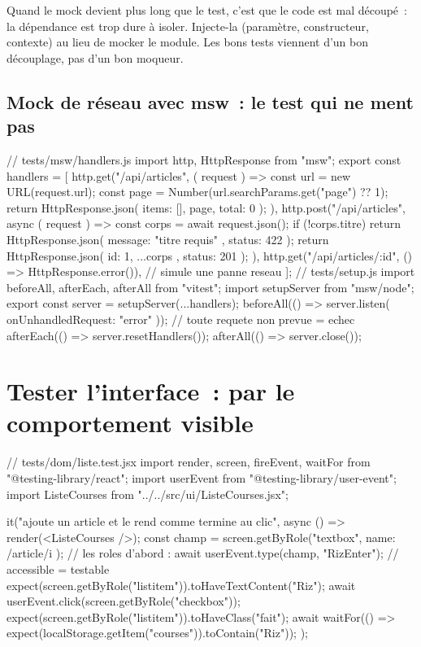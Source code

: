\documentclass[12pt,a4paper,twoside,openright]{book}
\begin{document}
\begin{astuce}
Quand le mock devient plus long que le test, c'est que le code est mal d\'ecoup\'e~: la d\'ependance
est trop dure \`a isoler. Injecte-la (param\`etre, constructeur, contexte) au lieu de mocker le
module. Les bons tests viennent d'un bon d\'ecouplage, pas d'un bon moqueur.
\end{astuce}

\subsection{Mock de r\'eseau avec msw~: le test qui ne ment pas}

\begin{codejs}
// tests/msw/handlers.js
import { http, HttpResponse } from "msw";
export const handlers = [
  http.get("/api/articles", ({ request }) => {
    const url = new URL(request.url);
    const page = Number(url.searchParams.get("page") ?? 1);
    return HttpResponse.json({ items: [], page, total: 0 });
  }),
  http.post("/api/articles", async ({ request }) => {
    const corps = await request.json();
    if (!corps.titre) return HttpResponse.json({ message: "titre requis" }, { status: 422 });
    return HttpResponse.json({ id: 1, ...corps }, { status: 201 });
  }),
  http.get("/api/articles/:id", () => HttpResponse.error()),        // simule une panne reseau
];
// tests/setup.js
import { beforeAll, afterEach, afterAll } from "vitest";
import { setupServer } from "msw/node";
export const server = setupServer(...handlers);
beforeAll(() => server.listen({ onUnhandledRequest: "error" }));   // toute requete non prevue = echec
afterEach(() => server.resetHandlers());
afterAll(() => server.close());
\end{codejs}

\section{Tester l'interface~: par le comportement visible}

\begin{codejs}
// tests/dom/liste.test.jsx
import { render, screen, fireEvent, waitFor } from "@testing-library/react";
import userEvent from "@testing-library/user-event";
import { ListeCourses } from "../../src/ui/ListeCourses.jsx";

it("ajoute un article et le rend comme termine au clic", async () => {
  render(<ListeCourses />);
  const champ = screen.getByRole("textbox", { name: /article/i });     // les roles d'abord :
  await userEvent.type(champ, "Riz{Enter}");                            //  accessible = testable
  expect(screen.getByRole("listitem")).toHaveTextContent("Riz");
  await userEvent.click(screen.getByRole("checkbox"));
  expect(screen.getByRole("listitem")).toHaveClass("fait");
  await waitFor(() => expect(localStorage.getItem("courses")).toContain("Riz"));
});
\end{codejs}
\end{document}
